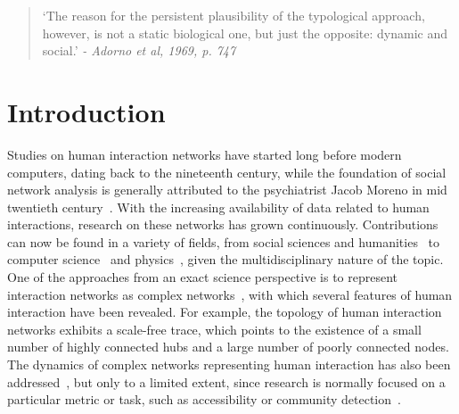 \documentclass[%
	aip,
	jmp,%
	amsmath,amssymb,
	reprint,%
]{revtex4-1}
\begin{document}
\maketitle

\begin{quotation}
	`The reason for the persistent plausibility of the typological approach, however, is not a static biological one, but just the opposite: dynamic and social.' 
	\emph{- Adorno et al, 1969, p. 747}
\end{quotation}


\section{Introduction}\label{sec:into}
Studies on human interaction networks have started long before modern computers, dating back to the nineteenth century, while the foundation of
social network analysis is generally attributed to the psychiatrist Jacob Moreno in mid twentieth century~\cite{moreno}. With the increasing availability of data related to human interactions, research on these networks has grown continuously. Contributions can now be found in a variety of fields, from social sciences and humanities~\cite{latour2013} to computer science~\cite{bird} and physics~\cite{barabasiHumanDyn,newmanFriendship}, given the multidisciplinary nature of the topic. One of the approaches from an exact science perspective is to represent interaction networks as complex networks~\cite{barabasiHumanDyn,newmanFriendship}, with which 
several features of human interaction have been revealed. For example, the topology of human interaction networks exhibits a scale-free trace, which points to the existence of a small number of highly connected hubs and a large number of poorly connected nodes. The dynamics of complex networks representing human interaction has also been addressed~\cite{barabasiEvo,newmanEvolving}, but only to a limited extent, since research is normally focused on a particular metric or task, such as accessibility or community detection~\cite{access,newmanModularity}. 
\end{document}
